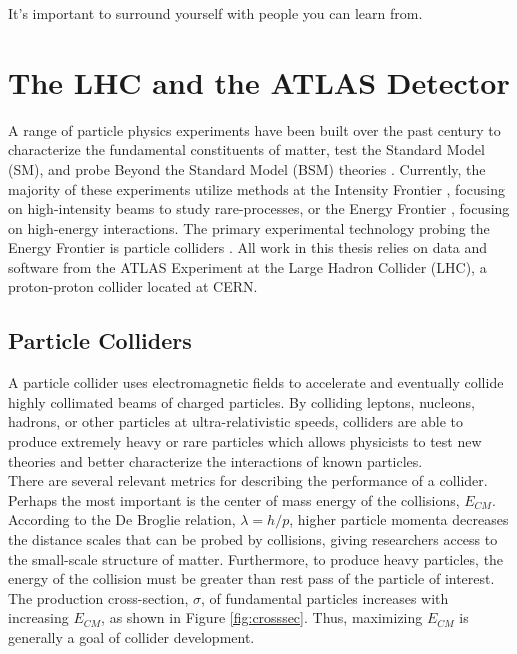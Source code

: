 \begin{savequote}[75mm]
It's important to surround yourself with people you can learn from.
\end{savequote}

\chapter{The LHC and the ATLAS Detector}

 A range of particle physics experiments have been built over the past century to characterize the fundamental constituents of matter, test the Standard Model (SM), and probe Beyond the Standard Model (BSM) theories \cite{history}. Currently, the majority of these experiments utilize methods at the Intensity Frontier \cite{intensity}, focusing on high-intensity beams to study rare-processes, or the Energy Frontier \cite{energy}, focusing on high-energy interactions. The primary experimental technology probing the Energy Frontier is particle colliders \cite{energy_colliders}. All work in this thesis relies on data and software from the ATLAS Experiment at the Large Hadron Collider (LHC), a proton-proton collider located at CERN.

\section{Particle Colliders}
A particle collider uses electromagnetic fields to accelerate and eventually collide highly collimated beams of charged particles. By colliding leptons, nucleons, hadrons, or other particles at ultra-relativistic speeds, colliders are able to produce extremely heavy or rare particles which allows physicists to test new theories and better characterize the interactions of known particles. \\

There are several relevant metrics for describing the performance of a collider. Perhaps the most important is the center of mass energy of the collisions, $E_{CM}$. According to the De Broglie relation, $\lambda=h/p$, higher particle momenta decreases the distance scales that can be probed by collisions, giving researchers access to the small-scale structure of matter. Furthermore, to produce heavy particles, the energy of the collision must be greater than rest pass of the particle of interest. The production cross-section, $\sigma$, of fundamental particles increases with increasing $E_{CM}$, as shown in Figure \ref{fig:crosssec}. Thus, maximizing $E_{CM}$ is generally a goal of collider development.\\


